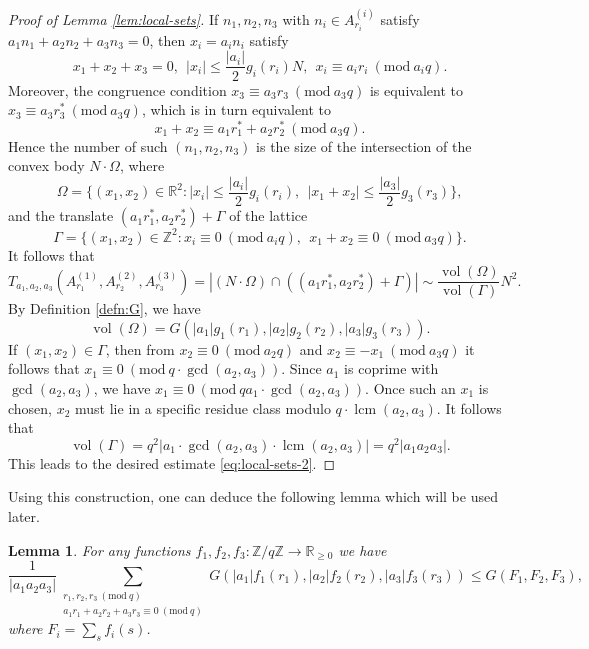 \documentclass[12pt, notitlepage]{amsart}
\numberwithin{equation}{section}
\def\R{\mathbb R}
\def\Z{\mathbb Z}
\def\gcd{\operatorname{gcd}}
\newcommand{\vol}{\operatorname{vol}}
\newcommand{\lcm}{\operatorname{lcm}}
\newcommand{\Mod}[1]{\ (\mathrm{mod}\ #1)}
\newtheorem{lemma}[theorem]{Lemma}
\theoremstyle{remark}
\theoremstyle{definition}
\theoremstyle{remark}
\numberwithin{equation}{section}
\begin{document}
\begin{proof}[Proof of Lemma \ref{lem:local-sets}]
If $n_1,n_2,n_3$ with $n_i \in A^{(i)}_{r_i}$ satisfy $a_1n_1+a_2n_2+a_3n_3 = 0$, then $x_i = a_in_i$ satisfy
$$
x_1 + x_2 + x_3 = 0, \ \ |x_i| \leq \frac{|a_i|}{2}g_i(r_i)N, \ \ x_i \equiv a_ir_i\Mod{a_iq}. 
$$
Moreover, the congruence condition $x_3 \equiv a_3r_3\Mod{a_3q}$ is equivalent to $x_3 \equiv a_3r_3^*\Mod{a_3q}$, which is in turn equivalent to
$$
x_1+x_2 \equiv a_1r_1^*+a_2r_2^*\Mod{a_3q}.
$$
Hence the number of such $(n_1,n_2,n_3)$ is the size of the intersection of the convex body $N \cdot \Omega$, where
$$
\Omega = \Big\{(x_1, x_2) \in \R^2: |x_i| \leq \frac{|a_i|}{2}g_i(r_i), \ \ |x_1+x_2|\leq \frac{|a_3|}{2}g_3(r_3)\Big\},
$$
and the translate $(a_1r_1^*, a_2r_2^*) + \Gamma$ of the lattice
$$
\Gamma = \{(x_1, x_2) \in \Z^2: x_i \equiv 0\Mod{a_iq}, \ \ x_1+x_2\equiv 0\Mod{a_3q}\}.
$$
It follows that
$$
T_{a_1,a_2,a_3}(A^{(1)}_{r_1},A^{(2)}_{r_2},A^{(3)}_{r_3}) = |(N\cdot \Omega) \cap ((a_1r_1^*,a_2r_2^*) + \Gamma)| \sim \frac{\vol(\Omega)}{\vol(\Gamma)} N^2.
$$
By Definition \ref{defn:G}, we have 
$$
\vol(\Omega) = G(|a_1|g_1(r_1), |a_2|g_2(r_2), |a_3|g_3(r_3)). 
$$
If $(x_1,x_2) \in \Gamma$, then from $x_2 \equiv 0\Mod{a_2q}$ and $x_2 \equiv -x_1\Mod{a_3q}$ it follows that $x_1 \equiv 0\Mod{q\cdot \gcd(a_2,a_3)}$. Since $a_1$ is coprime with $\gcd(a_2,a_3)$, we have $x_1 \equiv 0\Mod{qa_1\cdot \gcd(a_2,a_3)}$. Once such an $x_1$ is chosen, $x_2$ must lie in a specific residue class modulo $q\cdot \lcm(a_2,a_3)$. It follows that 
$$
\vol(\Gamma) = q^2|a_1 \cdot \gcd(a_2,a_3) \cdot \lcm(a_2,a_3)| = q^2 |a_1a_2a_3|.
$$
This leads to the desired estimate \eqref{eq:local-sets-2}.
\end{proof}

Using this construction, one can deduce the following lemma which will be used later.

\begin{lemma}\label{lem:G-sumbound}
For any functions $f_1,f_2,f_3: \Z/q\Z \rightarrow \R_{\geq 0}$ we have
$$
\frac{1}{|a_1a_2a_3|} \sum_{\substack{r_1,r_2,r_3\Mod{q} \\ a_1r_1+a_2r_2+a_3r_3\equiv 0\Mod{q}}} G(|a_1|f_1(r_1), |a_2|f_2(r_2), |a_3|f_3(r_3)) \leq G(F_1, F_2, F_3),
$$
where $F_i = \sum_s f_i(s)$.
\end{lemma}
\end{document}
